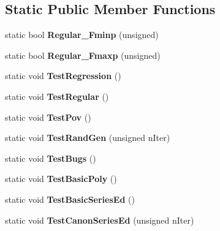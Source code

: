 \subsection*{Static Public Member Functions}
\begin{DoxyCompactItemize}
\item 
\mbox{\label{classtest_1_1_test_a1c025337939a36bee29e64da9edf1bcc}} 
static bool {\bfseries Regular\+\_\+\+Fminp} (unsigned)
\item 
\mbox{\label{classtest_1_1_test_aaa56ab62ca5de9bdef42de2557edd2cb}} 
static bool {\bfseries Regular\+\_\+\+Fmaxp} (unsigned)
\item 
\mbox{\label{classtest_1_1_test_aaa7c69e3b00ffbe4c65e717896fa9beb}} 
static void {\bfseries Test\+Regression} ()
\item 
\mbox{\label{classtest_1_1_test_ab7f3e76eefb76dd927c98137cdba52bb}} 
static void {\bfseries Test\+Regular} ()
\item 
\mbox{\label{classtest_1_1_test_aabd2cd29eff0890aceabc99963d8a331}} 
static void {\bfseries Test\+Pov} ()
\item 
\mbox{\label{classtest_1_1_test_a4b160ab1f7ea4cd798e27b4ec4c50244}} 
static void {\bfseries Test\+Rand\+Gen} (unsigned n\+Iter)
\item 
\mbox{\label{classtest_1_1_test_a8bf8e3d8c74e8ba95e7ff928540fca7f}} 
static void {\bfseries Test\+Bugs} ()
\item 
\mbox{\label{classtest_1_1_test_a731a1ba2ac4ccba93f5caa760a7d1ac9}} 
static void {\bfseries Test\+Basic\+Poly} ()
\item 
\mbox{\label{classtest_1_1_test_ae9ef88424e87e06e51e67eabdeb8e508}} 
static void {\bfseries Test\+Basic\+Series\+Ed} ()
\item 
\mbox{\label{classtest_1_1_test_a31cf29564c2b74f78644f89442baabae}} 
static void {\bfseries Test\+Canon\+Series\+Ed} (unsigned n\+Iter)
\item 

\end{DoxyCompactItemize}
